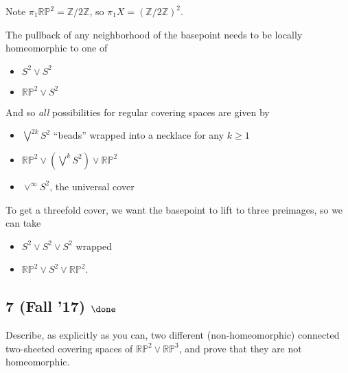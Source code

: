 \begin{solution}

\hfill

\begin{concept}

\hfill

\end{concept}

Note \(\pi_1 {\mathbb{RP}}^2 = {\mathbb{Z}}/2{\mathbb{Z}}\), so
\(\pi_1 X = ({\mathbb{Z}}/2{\mathbb{Z}})^2\).

The pullback of any neighborhood of the basepoint needs to be locally
homeomorphic to one of

\begin{itemize}
\tightlist
\item
  \(S^2 \vee S^2\)
\item
  \({\mathbb{RP}}^2 \vee S^2\)
\end{itemize}

And so \emph{all} possibilities for regular covering spaces are given by

\begin{itemize}
\tightlist
\item
  \(\bigvee^{2k} S^2\) ``beads'' wrapped into a necklace for any
  \(k \geq 1\)
\item
  \({\mathbb{RP}}^2 \vee (\bigvee^k S^2) \vee {\mathbb{RP}}^2\)
\item
  \(\vee^\infty S^2\), the universal cover
\end{itemize}

To get a threefold cover, we want the basepoint to lift to three
preimages, so we can take

\begin{itemize}
\tightlist
\item
  \(S^2 \vee S^2 \vee S^2\) wrapped
\item
  \({\mathbb{RP}}^2 \vee S^2 \vee {\mathbb{RP}}^2\).
\end{itemize}

\end{solution}

\hypertarget{fall-17-done}{%
\subsection{\texorpdfstring{7 (Fall '17)
\(\done\)}{7 (Fall '17) \textbackslash done}}\label{fall-17-done}}

Describe, as explicitly as you can, two different (non-homeomorphic)
connected two-sheeted covering spaces of
\({\mathbb{RP}}^2 \lor {\mathbb{RP}}^3\), and prove that they are not
homeomorphic.

